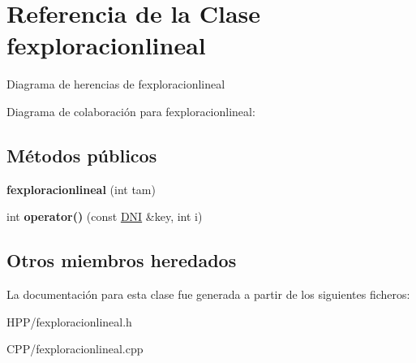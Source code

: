 \hypertarget{classfexploracionlineal}{}\section{Referencia de la Clase fexploracionlineal}
\label{classfexploracionlineal}


Diagrama de herencias de fexploracionlineal


Diagrama de colaboración para fexploracionlineal\+:
\subsection*{Métodos públicos}
\begin{DoxyCompactItemize}
\item 
\mbox{\label{classfexploracionlineal_a8e73fa58c305991576e02332b6c714a3}} 
{\bfseries fexploracionlineal} (int tam)
\item 
\mbox{\label{classfexploracionlineal_a6899bc14ec27db85a76406b282fa2ee6}} 
int {\bfseries operator()} (const \hyperlink{classDNI}{D\+NI} \&key, int i)
\end{DoxyCompactItemize}
\subsection*{Otros miembros heredados}


La documentación para esta clase fue generada a partir de los siguientes ficheros\+:\begin{DoxyCompactItemize}
\item 
H\+P\+P/fexploracionlineal.\+h\item 
C\+P\+P/fexploracionlineal.\+cpp\end{DoxyCompactItemize}
